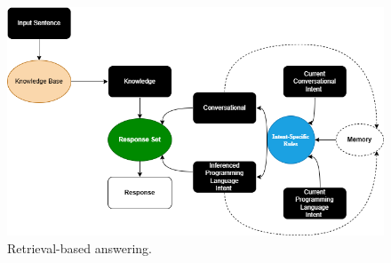 \documentclass[conference]{IEEEtran}
\begin{document}
    \begin{figure}[htbp]
        \centerline{\includegraphics[scale=0.35]{Figures/retrieval.png}}
        \caption{Retrieval-based answering.}
    \label{Fig. 4}
    \end{figure}
    
\end{document}
